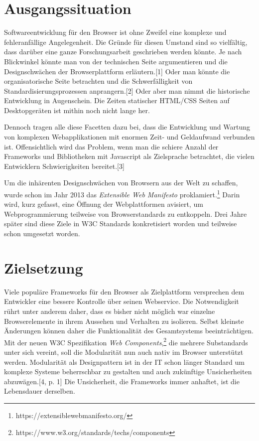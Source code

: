 \section{Ausgangssituation}\label{ausgangssituation}

Softwareentwicklung für den Browser ist ohne Zweifel eine komplexe und
fehleranfällige Angelegenheit. Die Gründe für diesen Umstand sind so
vielfältig, dass darüber eine ganze Forschungsarbeit geschrieben werden
könnte. Je nach Blickwinkel könnte man von der technischen Seite
argumentieren und die Designschwächen der Browserplattform
erläutern.{[}1{]} Oder man könnte die organisatorische Seite betrachten
und die Schwerfälligkeit von Standardisierungsprozessen
anprangern.{[}2{]} Oder aber man nimmt die historische Entwicklung in
Augenschein. Die Zeiten statischer HTML/CSS Seiten auf Desktopgeräten
ist mithin noch nicht lange her.

Dennoch tragen alle diese Facetten dazu bei, dass die Entwicklung und
Wartung von komplexen Webapplikationen mit enormen Zeit- und Geldaufwand
verbunden ist. Offensichtlich wird das Problem, wenn man die schiere
Anzahl der Frameworks und Bibliotheken mit Javascript als Zielsprache
betrachtet, die vielen Entwicklern Schwierigkeiten bereitet.{[}3{]}

Um die inhärenten Designschwächen von Browsern aus der Welt zu schaffen,
wurde schon im Jahr 2013 das \emph{Extensible Web Manifesto}
proklamiert.\footnote{https://extensiblewebmanifesto.org/} Darin wird,
kurz gefasst, eine Öffnung der Webplattformen avisiert, um
Webprogrammierung teilweise von Browserstandards zu entkoppeln. Drei
Jahre später sind diese Ziele in W3C Standards konkretisiert worden und
teilweise schon umgesetzt worden.

\section{Zielsetzung}\label{zielsetzung}

Viele populäre Frameworks für den Browser als Zielplattform versprechen
dem Entwickler eine bessere Kontrolle über seinen Webservice. Die
Notwendigkeit rührt unter anderem daher, dass es bisher nicht möglich
war einzelne Browserelemente in ihrem Aussehen und Verhalten zu
isolieren. Selbst kleinste Änderungen können daher die Funktionalität
des Gesamtsystems beeinträchtigen. Mit der neuen W3C Spezifikation
\emph{Web Components},\footnote{https://www.w3.org/standards/techs/components}
die mehrere Substandards unter sich vereint, soll die Modularität nun
auch nativ im Browser unterstützt werden. Modularität als Designpattern
ist in der IT schon länger Standard um komplexe Systeme beherrschbar zu
gestalten und auch zukünftige Unsicherheiten abzuwägen.{[}4, p. 1{]} Die
Unsicherheit, die Frameworks immer anhaftet, ist die Lebensdauer
derselben.

